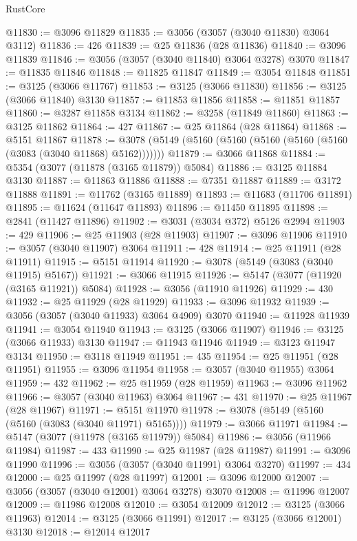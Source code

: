 \begin{lexlean}{RustCore}
\begin{coremodule}
@11830 := @3096 @11829
@11835 := @3056 (@3057 (@3040 @11830) @3064 @3112)
@11836 := 426
@11839 := @25 @11836 (@28 @11836)
@11840 := @3096 @11839
@11846 := @3056 (@3057 (@3040 @11840) @3064 @3278) @3070
@11847 := @11835 @11846
@11848 := @11825 @11847
@11849 := @3054 @11848
@11851 := @3125 (@3066 @11767)
@11853 := @3125 (@3066 @11830)
@11856 := @3125 (@3066 @11840) @3130
@11857 := @11853 @11856
@11858 := @11851 @11857
@11860 := @3287 @11858 @3134
@11862 := @3258 (@11849 @11860)
@11863 := @3125 @11862
@11864 := 427
@11867 := @25 @11864 (@28 @11864)
@11868 := @5151 @11867
@11878 := @3078 (@5149 (@5160 (@5160 (@5160 (@5160 (@5160 (@3083 (@3040 @11868) @5162)))))))
@11879 := @3066 @11868
@11884 := @5354 (@3077 (@11878 (@3165 @11879)) @5084)
@11886 := @3125 @11884 @3130
@11887 := @11863 @11886
@11888 := @7351 @11887
@11889 := @3172 @11888
@11891 := @11762 (@3165 @11889)
@11893 := @11683 (@11706 @11891)
@11895 := @11624 (@11647 @11893)
@11896 := @11450 @11895
@11898 := @2841 (@11427 @11896)
@11902 := @3031 (@3034 @372) @5126 @2994
@11903 := 429
@11906 := @25 @11903 (@28 @11903)
@11907 := @3096 @11906
@11910 := @3057 (@3040 @11907) @3064
@11911 := 428
@11914 := @25 @11911 (@28 @11911)
@11915 := @5151 @11914
@11920 := @3078 (@5149 (@3083 (@3040 @11915) @5167))
@11921 := @3066 @11915
@11926 := @5147 (@3077 (@11920 (@3165 @11921)) @5084)
@11928 := @3056 (@11910 @11926)
@11929 := 430
@11932 := @25 @11929 (@28 @11929)
@11933 := @3096 @11932
@11939 := @3056 (@3057 (@3040 @11933) @3064 @4909) @3070
@11940 := @11928 @11939
@11941 := @3054 @11940
@11943 := @3125 (@3066 @11907)
@11946 := @3125 (@3066 @11933) @3130
@11947 := @11943 @11946
@11949 := @3123 @11947 @3134
@11950 := @3118 @11949
@11951 := 435
@11954 := @25 @11951 (@28 @11951)
@11955 := @3096 @11954
@11958 := @3057 (@3040 @11955) @3064
@11959 := 432
@11962 := @25 @11959 (@28 @11959)
@11963 := @3096 @11962
@11966 := @3057 (@3040 @11963) @3064
@11967 := 431
@11970 := @25 @11967 (@28 @11967)
@11971 := @5151 @11970
@11978 := @3078 (@5149 (@5160 (@5160 (@3083 (@3040 @11971) @5165))))
@11979 := @3066 @11971
@11984 := @5147 (@3077 (@11978 (@3165 @11979)) @5084)
@11986 := @3056 (@11966 @11984)
@11987 := 433
@11990 := @25 @11987 (@28 @11987)
@11991 := @3096 @11990
@11996 := @3056 (@3057 (@3040 @11991) @3064 @3270)
@11997 := 434
@12000 := @25 @11997 (@28 @11997)
@12001 := @3096 @12000
@12007 := @3056 (@3057 (@3040 @12001) @3064 @3278) @3070
@12008 := @11996 @12007
@12009 := @11986 @12008
@12010 := @3054 @12009
@12012 := @3125 (@3066 @11963)
@12014 := @3125 (@3066 @11991)
@12017 := @3125 (@3066 @12001) @3130
@12018 := @12014 @12017

\end{coremodule}
\end{lexlean}
